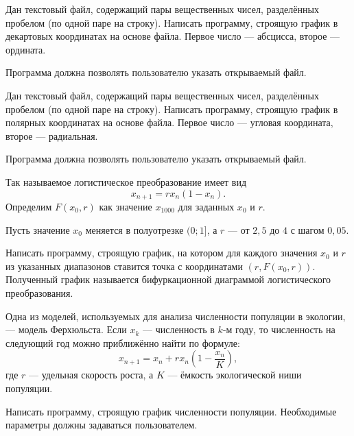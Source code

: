 \task Дан текстовый файл, содержащий пары вещественных чисел,
разделённых пробелом (по одной паре на строку). Написать программу,
строящую график в декартовых координатах на основе файла. Первое число
— абсцисса, второе — ордината.

Программа должна позволять пользователю указать открываемый файл.

\task Дан текстовый файл, содержащий пары вещественных чисел,
разделённых пробелом (по одной паре на строку). Написать программу,
строящую график в полярных координатах на основе файла. Первое число —
угловая координата, второе — радиальная.

Программа должна позволять пользователю указать открываемый файл.

\task Так называемое логистическое преобразование имеет вид
\[
x_{n+1} = rx_n(1-x_n).
\]
Определим $F(x_0, r)$ как значение $x_{1000}$ для заданных $x_0$ и $r$.

Пусть значение $x_0$ меняется в полуотрезке $(0;1]$, а $r$ — от $2{,}5$
до $4$ с шагом $0{,}05$.

Написать программу, строящую график, на котором для каждого значения
$x_0$ и $r$ из указанных диапазонов ставится точка с координатами
$(r, F(x_0, r))$. Полученный график называется бифуркационной
диаграммой логистического преобразования.

\task Одна из моделей, используемых для анализа численности популяции
в экологии, — модель Ферхюльста. Если $x_k$ — численность в $k$-м
году, то численность на следующий год можно приближённо найти по
формуле:
\[
x_{n+1} = x_n + r x_n \left( 1 - \frac{x_n}K \right),
\]
где $r$ — удельная скорость роста, а $K$ — ёмкость экологической ниши
популяции.

Написать программу, строящую график численности популяции. Необходимые
параметры должны задаваться пользователем.

